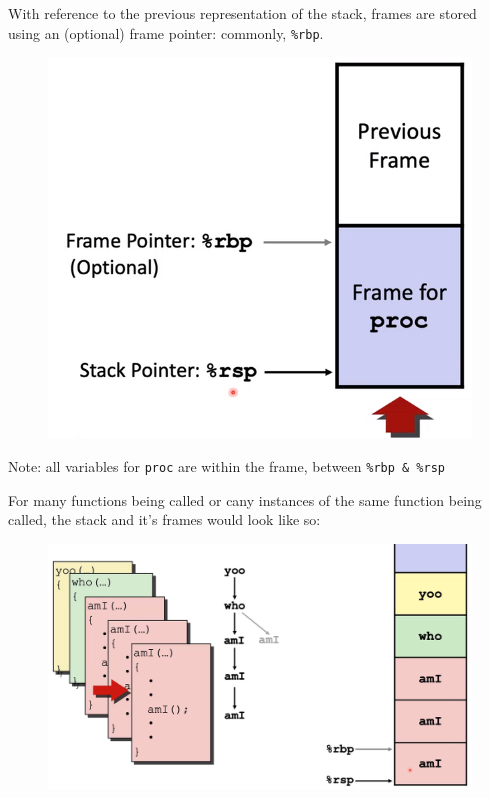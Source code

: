 \documentclass[12pt]{book}
\begin{document}
With reference to the previous representation of the stack, frames are stored using an (optional) frame pointer: 
commonly, \texttt{\%rbp}.

\begin{figure}[h]
        \centering
        \includegraphics[scale = 0.4]{./figures/stackframe}
\end{figure}

Note: all variables for \texttt{proc} are within the frame, between \texttt{\%rbp \& \%rsp}
\pagebreak

For many functions being called or cany instances of the same function being called, the stack and it's frames
would look like so:
\begin{figure}[h]
        \centering
        \includegraphics[scale = 0.3]{./figures/stackframeMany}
\end{figure}
\end{document}
